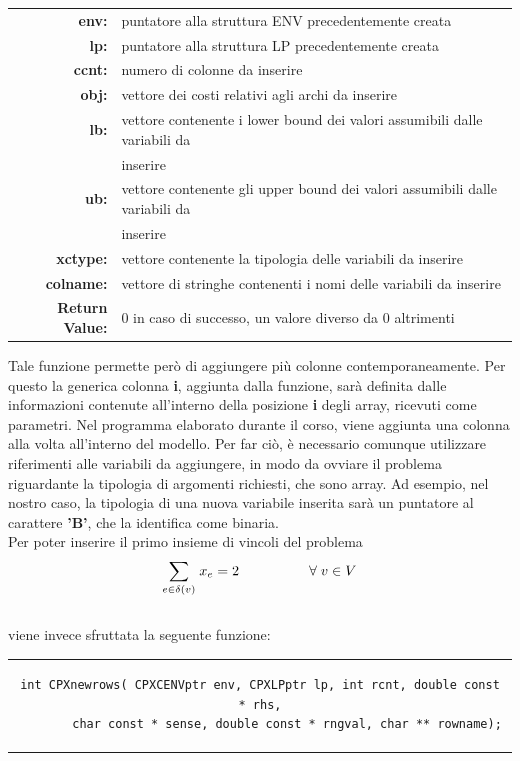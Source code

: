 \begin{table}[h]
\begin{tabular}{rl}
\textbf{env:} & {puntatore alla struttura ENV precedentemente creata}\\
\textbf{lp:} & {puntatore alla struttura LP precedentemente creata}\\
\textbf{ccnt:} & {numero di colonne da inserire} \\    
\textbf{obj:} & {vettore dei costi relativi agli archi da inserire} \\
\textbf{lb:} & {vettore contenente i lower bound dei valori assumibili dalle variabili da}\\
&{inserire}\\            
\textbf{ub:} & {vettore contenente gli upper bound dei valori assumibili dalle variabili da}\\
&{inserire}\\
\textbf{xctype:} & {vettore contenente la tipologia delle variabili da inserire}\\
\textbf{colname:} & {vettore di stringhe contenenti i nomi delle variabili da inserire}\\
\textbf{Return Value:} & {0 in caso di successo, un valore diverso da 0 altrimenti}\\
\end{tabular}
\end{table}
Tale funzione permette però di aggiungere più colonne contemporaneamente. Per questo la generica colonna \textbf{i}, aggiunta dalla funzione, sarà definita dalle informazioni contenute all'interno della posizione \textbf{i} degli array, ricevuti come parametri. Nel programma elaborato durante il corso, viene aggiunta una colonna alla volta all'interno del modello. Per far ciò, è necessario comunque utilizzare riferimenti alle variabili da aggiungere, in modo da ovviare il problema riguardante la tipologia di argomenti richiesti, che sono array. Ad esempio, nel nostro caso, la tipologia di una nuova variabile inserita sarà un puntatore al carattere \textbf{'B'}, che la identifica come binaria.\\
Per poter inserire il primo insieme di vincoli del problema\\
$$
\underset{e\in \delta(v)}\sum{\;x_e} = 2\;\;\;\;\;\;\;\;\;\;\;\;\;\;\;\;\;\;\forall\;v\in V \\\\
$$
\\
viene invece sfruttata la seguente funzione:
\begin{center}
\begin{tabular}{c}
\begin{lstlisting}[linewidth=380pt, basicstyle=\footnotesize\sffamily,]  
int CPXnewrows( CPXCENVptr env, CPXLPptr lp, int rcnt, double const * rhs,
		char const * sense, double const * rngval, char ** rowname);   
\end{lstlisting}
\end{tabular}
\end{center}
